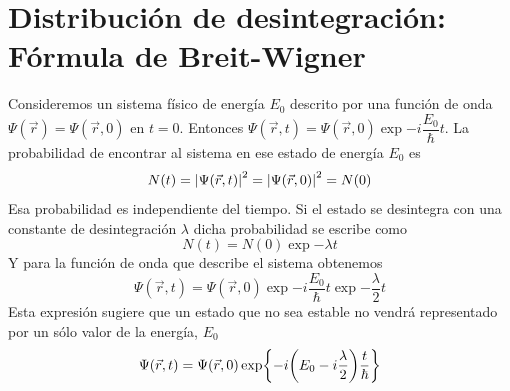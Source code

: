 \section{Distribución de desintegración: Fórmula de Breit-Wigner}
Consideremos un sistema físico de energía $E_
0$ descrito por una función de onda $\Psi(\vec{r})=\Psi(\vec{r},0)$ en $t=0$. Entonces $\Psi(\vec{r},t)=\Psi(\vec{r},0)\exp{-i\dfrac{E_0}{\hbar}t}$. La probabilidad de encontrar al sistema en ese estado de energía $E_0$ es
\begin{equation}
N(t)=\abs{\Psi(\vec{r},t)}^2=\abs{\Psi(\vec{r},0)}^2=N(0)
\end{equation}
Esa probabilidad es independiente del tiempo. Si el estado se desintegra con una constante de desintegración $\lambda$ dicha probabilidad se escribe como
\begin{equation}
    N(t)=N(0)\exp{-\lambda t}
\end{equation}
Y para la función de onda que describe el sistema obtenemos
\begin{equation}
    \Psi(\vec{r},t)=\Psi(\vec{r},0)\exp{-i\frac{E_0}{\hbar}t}\exp{-\frac{\lambda}{2} t}
\end{equation}
Esta expresión sugiere que un estado que no sea estable no vendrá representado por un sólo valor de la energía, $E_0$
\begin{equation}
    \Psi(\vec{r},t)=\Psi(\vec{r},0)\exp{-i\qty(E_0-i\frac{\lambda}{2})\frac{t}{\hbar}}
    \label{eq: funcion de onda estado inestable}
\end{equation}


